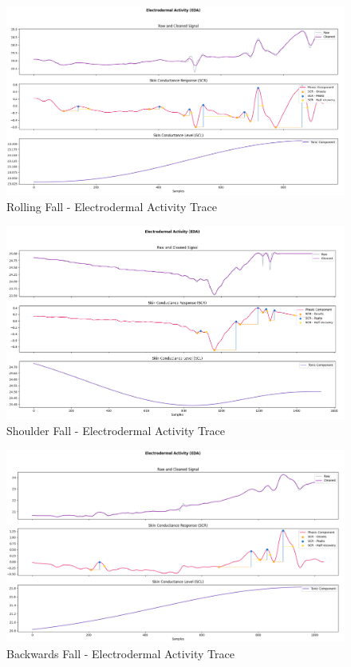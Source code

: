 \begin{figure}[H]
    \centering
    \includegraphics[width=\textwidth]{./images/bitalino/Rolling.png}
    \caption{Rolling Fall - Electrodermal Activity Trace}
    \label{fig:bitalino-rolling}
\end{figure}

\begin{figure}[H]
    \centering
    \includegraphics[width=\textwidth]{./images/bitalino/Shoulder.png}
    \caption{Shoulder Fall - Electrodermal Activity Trace}
    \label{fig:bitalino-shoulder}
\end{figure}

\begin{figure}[H]
    \centering
    \includegraphics[width=\textwidth]{./images/bitalino/Backwards.png}
    \caption{Backwards Fall - Electrodermal Activity Trace}
    \label{fig:bitalino-backwards}
\end{figure}

